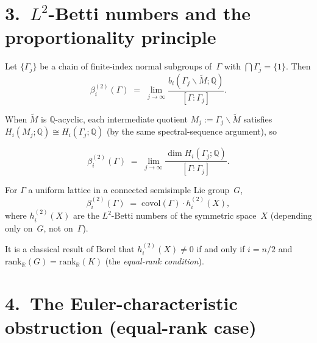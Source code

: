 \section*{3.\ $L^2$-Betti numbers and the proportionality principle}
\label{sec:p7-L2}

\begin{theorem}
\label{thm:p7-luck-approx}
Let $\{\Gamma_j\}$ be a chain of finite-index normal subgroups of~$\Gamma$
with $\bigcap \Gamma_j = \{1\}$. Then
\[
  \beta_i^{(2)}(\Gamma)
  \;=\;
  \lim_{j\to\infty}
  \frac{b_i(\Gamma_j\backslash\widetilde{M};\mathbb{Q})}{[\Gamma:\Gamma_j]}.
\]
\end{theorem}

When $\widetilde{M}$ is $\mathbb{Q}$-acyclic, each intermediate quotient
$M_j := \Gamma_j\backslash\widetilde{M}$ satisfies
$H_i(M_j;\mathbb{Q})\cong H_i(\Gamma_j;\mathbb{Q})$
(by the same spectral-sequence argument), so

\begin{equation}
\label{eq:p7-L2-vanish}
\beta_i^{(2)}(\Gamma)
\;=\;
\lim_{j\to\infty}
\frac{\dim H_i(\Gamma_j;\mathbb{Q})}{[\Gamma:\Gamma_j]}.
\end{equation}

\begin{theorem}
\label{thm:p7-proportionality}
For $\Gamma$ a uniform lattice in a connected semisimple Lie group~$G$,
\[
  \beta_i^{(2)}(\Gamma)
  \;=\;
  \mathrm{covol}(\Gamma)\cdot h_i^{(2)}(X),
\]
where $h_i^{(2)}(X)$ are the $L^2$-Betti numbers of the symmetric space~$X$
(depending only on~$G$, not on~$\Gamma$).
\end{theorem}

It is a classical result of Borel \cite{Bor85} that
$h_i^{(2)}(X)\ne 0$ if and only if $i = n/2$ and $\mathrm{rank}_\mathbb{R}(G)
= \mathrm{rank}_\mathbb{R}(K)$ (the \emph{equal-rank condition}).

\section*{4.\ The Euler-characteristic obstruction (equal-rank case)}
\label{sec:p7-euler}


